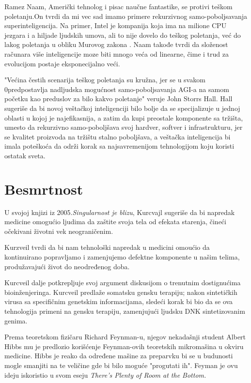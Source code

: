 \documentclass[a4paper]{article}
\begin{document}
Ramez Naam, Američki tehnolog i pisac naučne fantastike, se protivi teškom poletanju.On tvrdi da mi vec sad imamo primere rekurzivnog samo-poboljsavanja superinteligencija. Na primer, Intel je kompanija koja ima na milione CPU jezgara i a hiljade ljudskih umova, ali to nije dovelo do teškog poletanja, već do lakog poletanja u obliku Murovog zakona \cite{refe2}. Naam takođe tvrdi da složenost računara više inteligencije moze biti mnogo veća od linearne, čime i trud za evolucijom postaje eksponecijalno veći.\cite{refe3}

"Većina čestih scenarija teškog poletanja su kružna, jer se u svakom 0predpostavlja nadljudska mogućnost samo-poboljsavanja AGI-a na samom početku kao preduslov za bilo kakvo poletanje" veruje John Storrs Hall. Hall sugeriše da bi novoj veštačkoj inteligenciji bilo bolje da se specijalizuje u jednoj oblasti u kojoj je najefikasnija, a zatim da kupi preostale komponente sa tržišta, umesto da rekurzivno samo-poboljšava svoj hardver, softver i infrastrukturu, jer se kvalitet proizvoda na tržištu stalno poboljšava, a veštačka inteligencija bi imala poteškoća da održi korak sa najsavremenijom tehnologijom koju koristi ostatak sveta.\cite{refe4}

\section{Besmrtnost}
\label{sec:besmrtnost}
  U svojoj knjizi iz 2005.\textit {Singularnost je blizu}, Kurcvajl sugeriše da bi napredak medicine omogućio ljudima da zaštite svoja tela od efekata starenja, čineći očekivani životni vek neograničenim. 
  
  Kurzveil tvrdi da bi nam tehnološki napredak u medicini omoućio da kontinuirano popravljamo i zamenjujemo defektne komponente u našim telima, produžavajući život do neodređenog doba.
  
  Kurcveil dalje potkrepljuje svoj argument diskusijom o trenutnim dostignućima bioinženjeringa. Kurcveil predlaže somatsku gensku terapiju; nakon sintetičkih virusa sa specifičnim genetskim informacijama, sledeći korak bi bio da se ova tehnologija primeni na gensku terapiju, zamenjujući ljudsku DNK sintetizovanim genima.\cite{refe5}

  Prema teoretskom fizičaru  Richard Feynman-u, njegov nekadašnji student Albert Hibbs mu je predlozio korišćenje Feynman-ovih teoretskih mikromašina u okviru medicine. Hibbs je reako da određene mašine za preparvku bi se u budunosti mogle smanjiti na te veličine gde bi bilo moguće "progutati ih". Feyman je ovu ideju iskoristio u svom eseju \textit{ There's Plenty of Room at the Bottom.}\cite{refe6}
\end{document}
